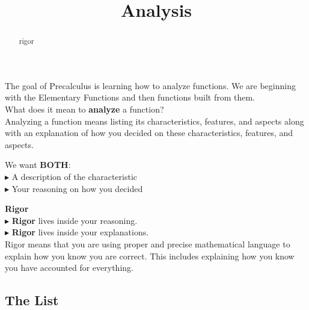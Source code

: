 \documentclass{ximera}
\title{Analysis}
\begin{document}
\begin{abstract}
rigor
\end{abstract}
\maketitle





The goal of Precalculus is learning how to analyze functions.  We are beginning with the Elementary Functions and then functions built from them. \\

What does it mean to \textbf{\textcolor{blue!55!black}{analyze}} a function? \\ 



Analyzing a function means listing its characteristics, features, and aspects along with an explanation of how you decided on these characteristics, features, and aspects.


We want \textbf{BOTH}: \\
\textbf{\textcolor{red!90!darkgray}{$\blacktriangleright$}} A description of the characteristic \\
\textbf{\textcolor{red!90!darkgray}{$\blacktriangleright$}} Your reasoning on how you decided \\



\begin{definition} \textbf{\textcolor{green!50!black}{Rigor}} \\


\textbf{\textcolor{red!90!darkgray}{$\blacktriangleright$}} \textbf{\textcolor{purple!85!blue}{Rigor}} lives inside your reasoning. \\

\textbf{\textcolor{red!90!darkgray}{$\blacktriangleright$}} \textbf{\textcolor{purple!85!blue}{Rigor}} lives inside your explanations. \\



Rigor means that you are using proper and precise mathematical language to explain how you know you are correct. This includes explaining how you know you have accounted for everything.


\end{definition}



\subsection{The List}
\end{document}
